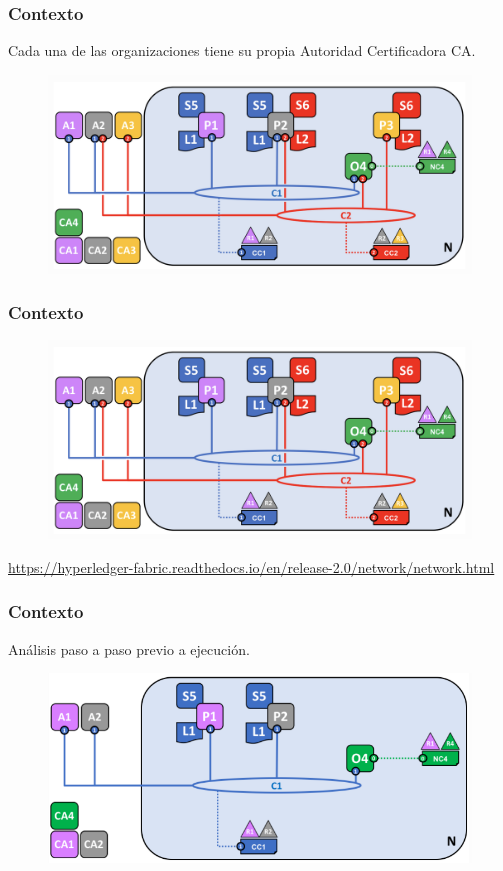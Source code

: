 \documentclass{beamer}
\begin{document}
	\begin{frame}
		\frametitle{Contexto}
		Cada una de las organizaciones tiene su propia Autoridad Certificadora CA.
		\begin{figure}[h]
			\includegraphics[scale=.3]{start_01}
			\centering
		\end{figure}
	\end{frame}
	
	\begin{frame}
		\frametitle{Contexto}
		\begin{figure}[h]
			\includegraphics[scale=.4]{start_01}
			\centering
		\end{figure}
		\begin{center}
			\tiny{\url{https://hyperledger-fabric.readthedocs.io/en/release-2.0/network/network.html}}
		\end{center}
	\end{frame}
	
	\begin{frame}
		\frametitle{Contexto}
		Análisis paso a paso previo a ejecución.
		\begin{figure}[h]
			\includegraphics[scale=.5]{start_03}
			\centering
		\end{figure}
	\end{frame}
	
\end{document}
